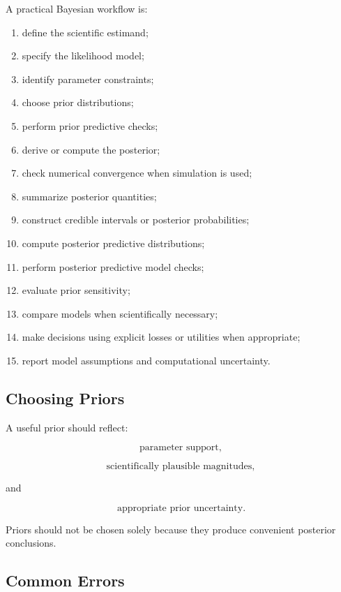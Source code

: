 A practical Bayesian workflow is:

\begin{enumerate}
    \item define the scientific estimand;
    \item specify the likelihood model;
    \item identify parameter constraints;
    \item choose prior distributions;
    \item perform prior predictive checks;
    \item derive or compute the posterior;
    \item check numerical convergence when simulation is used;
    \item summarize posterior quantities;
    \item construct credible intervals or posterior probabilities;
    \item compute posterior predictive distributions;
    \item perform posterior predictive model checks;
    \item evaluate prior sensitivity;
    \item compare models when scientifically necessary;
    \item make decisions using explicit losses or utilities when
          appropriate;
    \item report model assumptions and computational uncertainty.
\end{enumerate}

\subsection{Choosing Priors}
\label{subsec:choosing-priors}

A useful prior should reflect:

\[
\boxed{
\text{parameter support},
}
\]

\[
\boxed{
\text{scientifically plausible magnitudes},
}
\]

and

\[
\boxed{
\text{appropriate prior uncertainty}.
}
\]

Priors should not be chosen solely because they produce convenient
posterior conclusions.

\subsection{Common Errors}
\label{subsec:bayesian-common-errors}


